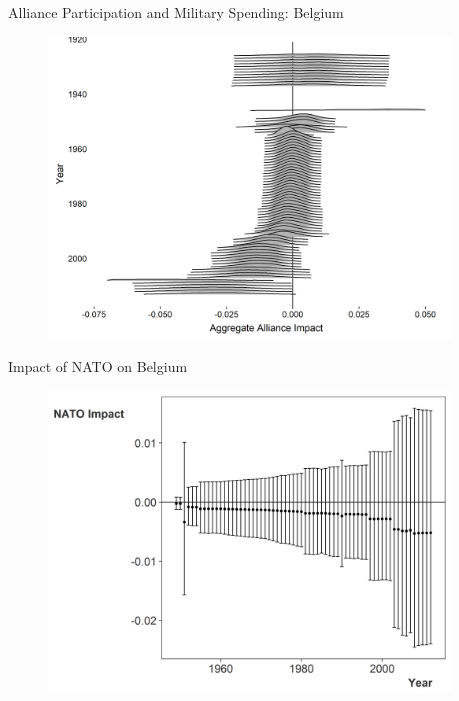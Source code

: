 \documentclass[12pt]{beamer}
\begin{document}

\begin{frame}{Alliance Participation and Military Spending: Belgium}


\begin{figure}
	\centering
		\includegraphics[width=0.95\textwidth]{bel-agg-imp.png}
\end{figure}


\end{frame}



\begin{frame}{Impact of NATO on Belgium}


\begin{figure}
	\centering
		\includegraphics[width=0.95\textwidth]{bel-nato-imp.png}
\end{figure}


\end{frame}
\end{document}
